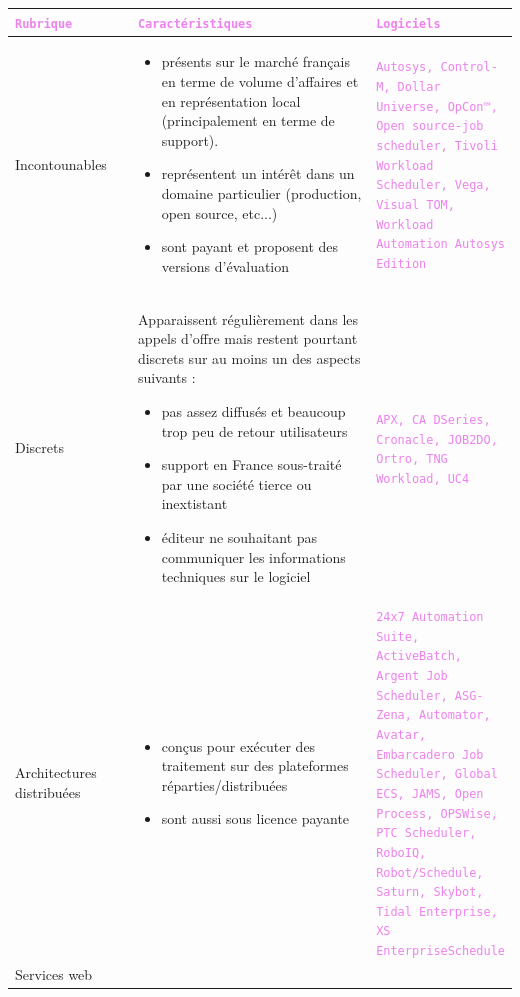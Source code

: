 \documentclass{bouygues-fr}
\begin{document}
  \begin{longtable}{| p{0.25\linewidth} | p{0.5\linewidth} | p{0.25\linewidth} |}
    \shrinkheight{-2cm}
    \hline
    \textcolor{violet}{\texttt{Rubrique}} & \textcolor{violet}{\texttt{Caractéristiques}} & \textcolor{violet}{\texttt{Logiciels}} \tabularnewline
    \hline
    Incontounables & 
    \begin{itemize}
    \item présents sur le marché français en terme de volume d’affaires et en représentation local (principalement en terme de support).
    \item représentent un intérêt dans un domaine particulier (production, open source, etc...)
    \item sont payant et proposent des versions d’évaluation
    \end{itemize} & 
    \textcolor{violet}{\texttt{Autosys, Control-M, Dollar Universe, OpCon™, Open source-job scheduler, Tivoli Workload Scheduler, Vega, Visual TOM, Workload Automation Autosys Edition}} \tabularnewline
    \hline
    Discrets &
    Apparaissent régulièrement dans les appels d’offre mais restent pourtant discrets sur au moins un des aspects suivants :
    \begin{itemize}
    \item pas assez diffusés et beaucoup trop peu de retour utilisateurs
    \item support en France sous-traité par une société tierce ou inextistant
    \item éditeur ne souhaitant pas communiquer les informations techniques sur le logiciel
    \end{itemize} &
    \textcolor{violet}{\texttt{APX, CA DSeries, Cronacle, JOB2DO, Ortro, TNG Workload, UC4}} \tabularnewline
    \hline
    Architectures distribuées &
    \begin{itemize}
    \item conçus pour exécuter des traitement sur des plateformes réparties/distribuées
    \item sont aussi sous licence payante
    \end{itemize} &
    \textcolor{violet}{\texttt{24x7 Automation Suite, ActiveBatch, Argent Job Scheduler, ASG-Zena, Automator, Avatar, Embarcadero Job Scheduler, Global ECS, JAMS, Open Process, OPSWise, PTC Scheduler, RoboIQ, Robot/Schedule, Saturn, Skybot, Tidal Enterprise, XS EnterpriseSchedule}} \tabularnewline
    \hline
    Services web &

\end{longtable}
\end{document}
